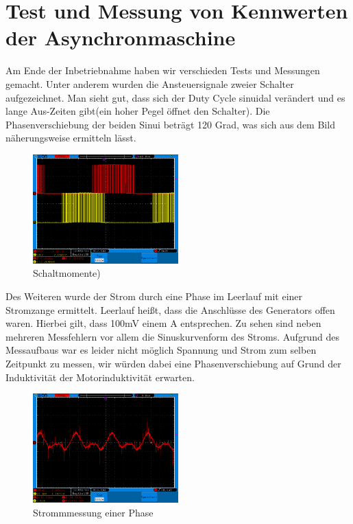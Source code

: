 
\section{Test und Messung von Kennwerten der Asynchronmaschine}

Am Ende der Inbetriebnahme haben wir verschieden Tests und Messungen gemacht. 
Unter anderem wurden die Ansteuersignale zweier Schalter aufgezeichnet. Man sieht gut, dass sich der Duty Cycle sinuidal verändert und es lange Aus-Zeiten gibt(ein hoher Pegel öffnet den Schalter). Die Phasenverschiebung der beiden Sinui beträgt 120 Grad, was sich aus dem Bild näherungsweise ermitteln lässt.
\begin{figure}[H]
		\includegraphics[width=0.5\textwidth]{uwgeregelt.png}
		\caption{Schaltmomente)}
		\label{fig:rreibChart}
	\end{figure}
	Des Weiteren wurde der Strom durch eine Phase im Leerlauf mit einer Stromzange ermittelt. Leerlauf heißt, dass die Anschlüsse des Generators offen waren. Hierbei gilt, dass 100mV einem A entsprechen. Zu sehen sind neben mehreren Messfehlern vor allem die Sinuskurvenform des Stroms. Aufgrund des Messaufbaus war es leider nicht möglich Spannung und Strom zum selben Zeitpunkt zu messen, wir würden dabei eine Phasenverschiebung auf Grund der Induktivität der Motorinduktivität erwarten.  
	\begin{figure}[H]
		\includegraphics[width=0.5\textwidth]{strom1Phase.png}
		\caption{Strommmessung einer Phase}
		\label{fig:rreibChart}
	\end{figure}